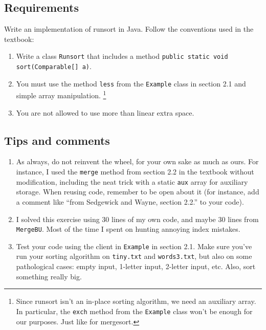 \documentclass{tufte-handout}
\begin{document}
\subsection{Requirements}
Write an implementation of runsort in Java.
Follow the conventions used in the textbook:
\begin{enumerate}
\item Write a class \texttt{Runsort} that includes a method
\texttt{public static void sort(Comparable[] a)}.
\item You must use the method \texttt{less} from the \texttt{Example} class in section 2.1 and  simple array manipulation.
\footnote{Since runsort isn't an in-place sorting algorithm, we  need an auxiliary array.
In particular, the \texttt{exch} method from the \texttt{Example} class won't be enough for our purposes.
Just like for mergesort.}
\item You are not allowed to use more than linear extra space.
\end{enumerate}

\subsection{Tips and comments}
\begin{enumerate}
\item As always, do not reinvent the wheel, for your own sake as much as ours.
For instance, I used the \texttt{merge} method from section 2.2 in the textbook without modification, including the neat trick with a static \texttt{aux} array for auxiliary storage.
When reusing code, remember to be open about it (for instance, add a comment like ``from Sedgewick and Wayne, section 2.2.'' to your code).
\item I solved this exercise using 30 lines of my own code, and maybe 30 lines from \texttt{MergeBU}.
Most of the time I spent on hunting annoying index mistakes.
\item Test your code using the client in \texttt{Example} in section 2.1.
Make sure you've run your sorting algorithm on \texttt{tiny.txt} and \texttt{words3.txt}, but also on some pathological cases: empty input, 1-letter input, 2-letter input, etc.
Also, sort something really big.
\end{enumerate}
\end{document}
